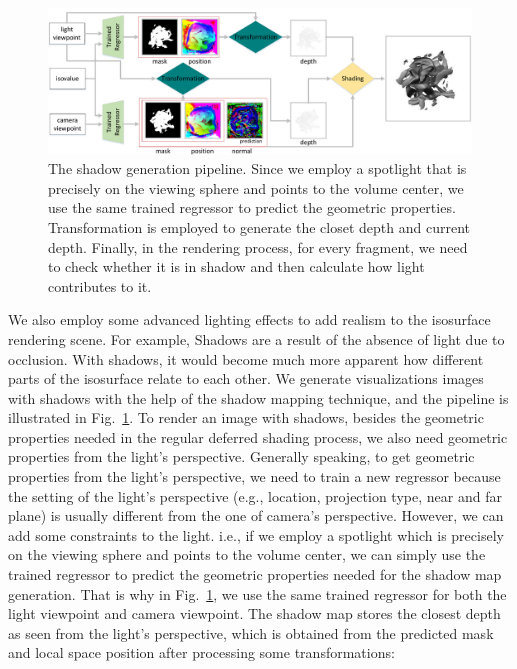 \documentclass[journal]{vgtc}                %
\begin{document}
\begin{figure}
  \centering
  \includegraphics[width=0.8\linewidth]{shadowMap}
  \caption{The shadow generation pipeline. Since we employ a spotlight that is precisely on the viewing sphere and points to the volume center, we use the same trained regressor to predict the geometric properties. Transformation is employed to generate the closet depth and current depth. Finally, in the rendering process, for every fragment, we need to check whether it is in shadow and then calculate how light contributes to it. }
  \label{fig:shadowMap}
\end{figure}

We also employ some advanced lighting effects to add realism to the isosurface rendering scene. For example, Shadows are a result of the absence of light due to occlusion. With shadows, it would become much more apparent how different parts of the isosurface relate to each other.
We generate visualizations images with shadows with the help of the shadow mapping \cite{williams1978casting} technique, and the pipeline is illustrated in Fig.~\ref{fig:shadowMap}. To render an image with shadows, besides the geometric properties needed in the regular deferred shading process, we also need geometric properties from the light's perspective. Generally speaking, to get geometric properties from the light's perspective, we need to train a new regressor because the setting of the light's perspective (e.g., location, projection type, near and far plane) is usually different from the one of camera's perspective. However, we can add some constraints to the light. i.e., if we employ a spotlight which is precisely on the viewing sphere and points to the volume center, we can simply use the trained regressor to predict the geometric properties needed for the shadow map generation. That is why in Fig.~\ref{fig:shadowMap}, we use the same trained regressor for both the light viewpoint and camera viewpoint. The shadow map stores the closest depth as seen from the light's perspective, which is obtained from the predicted mask and local space position after processing some transformations: 
\end{document}

